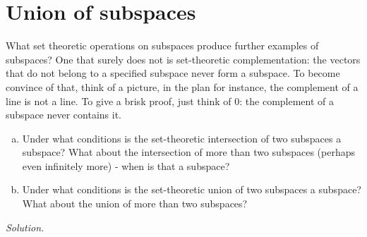 \section{Union of subspaces}

What set theoretic operations on subspaces produce further examples of subspaces? One that surely does not is set-theoretic complementation: the vectors that do not belong to a specified subspace never form a subspace. To become convince of that, think of a picture, in the plan for instance, the complement of a line is not a line. To give a brisk proof, just think of 0: the complement of a subspace never contains it.

\begin{problem}
\begin{enumerate}[(a)]
    \item Under what conditions is the set-theoretic intersection of two subspaces a subspace? What about the intersection of more than two subspaces (perhaps even infinitely more) - when is that a subspace?
    \item Under what conditions is the set-theoretic union of two subspaces a subspace? What about the union of more than two subspaces?
\end{enumerate}
\end{problem}

\textit{Solution.}

